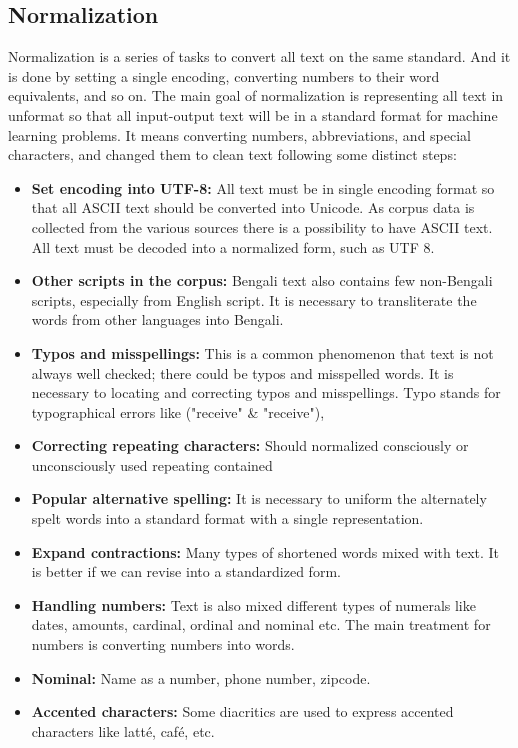 \subsection{Normalization}

Normalization is a series of tasks to convert all text on the same standard. And it is done by setting a single encoding, converting numbers to their word equivalents, and so on. The main goal of normalization is representing all text in unformat so that all input-output text will be in a standard format for machine learning problems. It means converting numbers, abbreviations, and special characters, and changed them to clean text following some distinct steps:
\begin{itemize}
    \item \textbf{Set encoding into UTF-8:} All text must be in single encoding format so that all ASCII text should be converted into Unicode. As corpus data is collected from the various sources there is a possibility to have ASCII text. All text must be decoded into a normalized form, such as UTF 8.
    \item \textbf{Other scripts in the corpus:} Bengali text also contains few non-Bengali scripts, especially from English script. It is necessary to transliterate the words from other languages into Bengali.
    \item \textbf{Typos and misspellings:} This is a common phenomenon that text is not always well checked; there could be typos and misspelled words. It is necessary to locating and correcting typos and misspellings. Typo stands for typographical errors like ("receive" \& "receive"),
    \item \textbf{Correcting repeating characters:} Should normalized consciously or unconsciously used repeating contained
    \item \textbf{Popular alternative spelling:} It is necessary to uniform the alternately spelt words into a standard format with a single representation.
    \item \textbf{Expand contractions:} Many types of shortened words mixed with text. It is better if we can revise into a standardized form.
    \item \textbf{Handling numbers:} Text is also mixed different types of numerals like dates, amounts, cardinal, ordinal and nominal etc. The main treatment for numbers is converting numbers into words.
    \item \textbf{Nominal:} Name as a number, phone number, zipcode.
    \item \textbf{Accented characters:} Some diacritics are used to express accented characters like latté, café, etc.
\end{itemize}